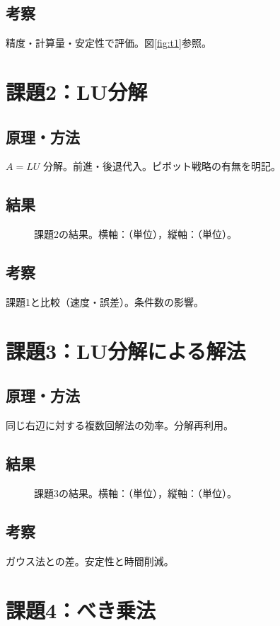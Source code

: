 \documentclass[a4paper,11pt]{ltjsarticle}
\begin{document}
\subsection{考察}
精度・計算量・安定性で評価。図\ref{fig:t1}参照。

\section{課題2：LU分解}
\subsection{原理・方法}
$A=LU$ 分解。前進・後退代入。ピボット戦略の有無を明記。
\subsection{結果}
\begin{figure}[H]
  \centering
  \caption{課題2の結果。横軸：（単位），縦軸：（単位）。}
  \label{fig:t2}
\end{figure}
\subsection{考察}
課題1と比較（速度・誤差）。条件数の影響。

\section{課題3：LU分解による解法}
\subsection{原理・方法}
同じ右辺に対する複数回解法の効率。分解再利用。
\subsection{結果}
\begin{figure}[H]
  \centering
  \caption{課題3の結果。横軸：（単位），縦軸：（単位）。}
  \label{fig:t3}
\end{figure}
\subsection{考察}
ガウス法との差。安定性と時間削減。

\section{課題4：べき乗法}
\end{document}

